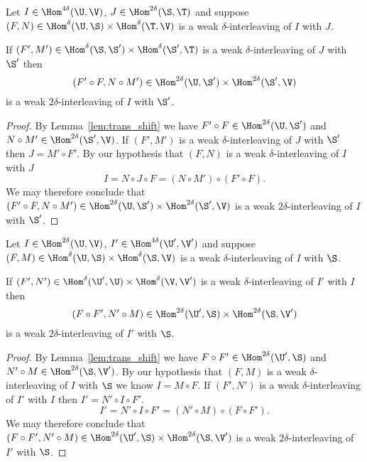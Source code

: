 \begin{lemma}\label{lem:left}
  Let $I\in\Hom^{4\delta}(\U,\V)$, $J\in\Hom^{2\delta}(\S,\T)$ and suppose $(F, N)\in\Hom^{\delta}(\U,\S)\times\Hom^\delta(\T,\V)$ is a weak $\delta$-interleaving of $I$ with $J$.

  If $(F', M')\in\Hom^\delta(\S,\S')\times\Hom^\delta(\S',\T)$ is a weak $\delta$-interleaving of $J$ with $\S'$ then
  \[(F'\circ F, N\circ M')\in\Hom^{2\delta}(\U,\S')\times \Hom^{2\delta}(\S',\V)\]
  is a weak $2\delta$-interleaving of $I$ with $\S'$.
\end{lemma}
\begin{proof}
  By Lemma~\ref{lem:trans_shift} we have $F'\circ F\in\Hom^{2\delta}(\U,\S')$ and $N\circ M'\in \Hom^{2\delta}(\S',\V)$.
  If $(F', M')$ is a weak $\delta$-interleaving of $J$ with $\S'$ then $J = M'\circ F'$.
  By our hypothesis that $(F, N)$ is a weak $\delta$-interleaving of $I$ with $J$
  \[ I = N\circ J\circ F = (N\circ M')\circ (F'\circ F).\]
  We may therefore conclude that $(F'\circ F, N\circ M')\in\Hom^{2\delta}(\U,\S')\times \Hom^{2\delta}(\S',\V)$ is a weak $2\delta$-interleaving of $I$ with $\S'$.
\end{proof}

\begin{lemma}\label{lem:right}
  Let $I\in\Hom^{2\delta}(\U,\V)$, $I'\in\Hom^{4\delta}(\U',\V')$ and suppose $(F, M)\in\Hom^\delta(\U,\S)\times\Hom^\delta(\S,\V)$ is a weak $\delta$-interleaving of $I$ with $\S$.

  If $(F',N')\in\Hom^\delta(\U',\U)\times\Hom^\delta(\V,\V')$ is a weak $\delta$-interleaving of $I'$ with $I$ then
  \[(F\circ F', N'\circ M)\in\Hom^{2\delta}(\U',\S)\times\Hom^{2\delta}(\S,\V')\]
  is a weak $2\delta$-interleaving of $I'$ with $\S$.
\end{lemma}
\begin{proof}
  By Lemma~\ref{lem:trans_shift} we have $F\circ F'\in \Hom^{2\delta}(\U',\S)$ and $N'\circ M\in \Hom^{2\delta}(\S,\V')$.
  By our hypothesis that $(F, M)$ is a weak $\delta$-interleaving of $I$ with $\S$ we know $I = M\circ F$.
  If $(F',N')$ is a weak $\delta$-interleaving of $I'$ with $I$ then $I' = N'\circ I\circ F'$.
  \[ I' = N'\circ I\circ F' = (N'\circ M)\circ (F\circ F').\]
  We may therefore conclude that $(F\circ F', N'\circ M)\in\Hom^{2\delta}(\U',\S)\times\Hom^{2\delta}(\S,\V')$ is a weak $2\delta$-interleaving of $I'$ with $\S$.
\end{proof}

